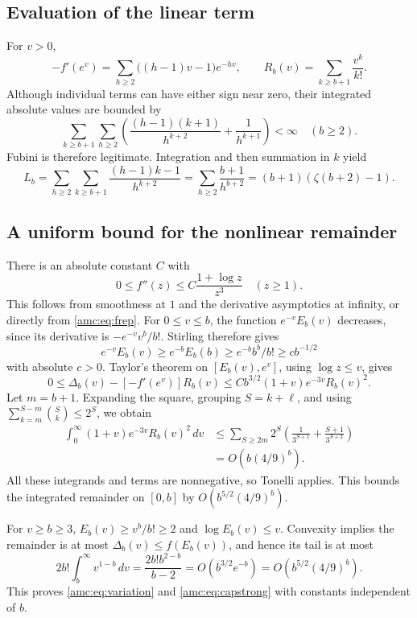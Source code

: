 \documentclass[11pt,letterpaper]{article}
\theoremstyle{remark}\newtheorem{remark}[theorem]{Remark}
\begin{document}
\subsection{Evaluation of the linear term}
For $v>0$,
\[
 -f'(e^v)=\sum_{h\ge2}\bigl((h-1)v-1\bigr)e^{-hv},\qquad
 R_b(v)=\sum_{k\ge b+1}\frac{v^k}{k!}.
\]
Although individual terms can have either sign near zero, their integrated absolute values are bounded by
\[
 \sum_{k\ge b+1}\sum_{h\ge2}
 \left(\frac{(h-1)(k+1)}{h^{k+2}}+\frac1{h^{k+1}}\right)<\infty
 \quad(b\ge2).
\]
Fubini is therefore legitimate. Integration and then summation in $k$ yield
\[
 L_b=\sum_{h\ge2}\sum_{k\ge b+1}\frac{(h-1)k-1}{h^{k+2}}
 =\sum_{h\ge2}\frac{b+1}{h^{b+2}}
 =(b+1)(\zeta(b+2)-1).
\]

\subsection{A uniform bound for the nonlinear remainder}
There is an absolute constant $C$ with
\begin{equation}\label{amc:eq:fsecond}
 0\le f''(z)\le C\frac{1+\log z}{z^3}\quad(z\ge1).
\end{equation}
This follows from smoothness at $1$ and the derivative asymptotics at infinity, or directly from \eqref{amc:eq:frep}. For $0\le v\le b$, the function $e^{-v}E_b(v)$ decreases, since its derivative is $-e^{-v}v^b/b!$. Stirling therefore gives
\[
 e^{-v}E_b(v)\ge e^{-b}E_b(b)\ge e^{-b}b^b/b!\ge c b^{-1/2}
\]
with absolute $c>0$. Taylor's theorem on $[E_b(v),e^v]$, using $\log z\le v$, gives
\begin{equation}\label{amc:eq:remainderpoint}
 0\le\Delta_b(v)-[-f'(e^v)]R_b(v)
 \le C b^{3/2}(1+v)e^{-3v}R_b(v)^2.
\end{equation}
Let $m=b+1$. Expanding the square, grouping $S=k+\ell$, and using
$\sum_{k=m}^{S-m}\binom Sk\le2^S$, we obtain
\begin{align*}
 \int_0^\infty(1+v)e^{-3v}R_b(v)^2\,dv
 &\le\sum_{S\ge2m}2^S
 \left(\frac1{3^{S+1}}+\frac{S+1}{3^{S+2}}\right)\\
 &=O\!\left(b(4/9)^b\right).
\end{align*}
All these integrands and terms are nonnegative, so Tonelli applies. This bounds the integrated remainder on $[0,b]$ by $O(b^{5/2}(4/9)^b)$.

For $v\ge b\ge3$, $E_b(v)\ge v^b/b!\ge2$ and $\log E_b(v)\le v$. Convexity implies the remainder is at most $\Delta_b(v)\le f(E_b(v))$, and hence its tail is at most
\[
 2b!\int_b^\infty v^{1-b}\,dv
 =\frac{2b!b^{2-b}}{b-2}
 =O(b^{3/2}e^{-b})
 =O\!\left(b^{5/2}(4/9)^b\right).
\]
This proves \eqref{amc:eq:variation} and \eqref{amc:eq:capstrong} with constants independent of $b$.
\end{document}
